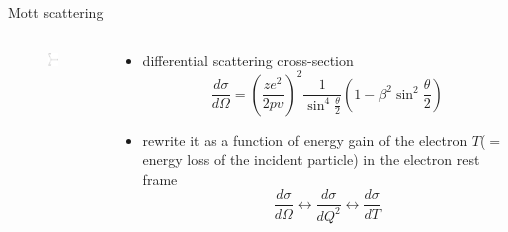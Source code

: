 \documentclass{beamer}
\begin{document}
\begin{frame}{Mott scattering}
\begin{columns}
	\begin{column}{0.2\textwidth}
		\begin{figure}
			\includegraphics[width=\textwidth]{plots/Mott_Feyn.pdf}
		\end{figure}
	\end{column}
	\begin{column}{0.8\textwidth}
	\begin{itemize}
	\item	differential scattering cross-section
		\begin{equation}
		\frac{d\sigma}{d\Omega}=\left( \frac{ze^2}{2pv} \right)^2 \frac{1}{\sin^4\frac{\theta}{2}} \left( 1-\beta^2\sin^2\frac{\theta}{2} \right)
		\end{equation}
	\item rewrite it as a function of energy gain of the electron $T$($=$ energy loss of the incident particle) in the electron rest frame
		\begin{equation*}
		\frac{d\sigma}{d\Omega}\leftrightarrow \frac{d\sigma}{dQ^2}\leftrightarrow \frac{d\sigma}{dT}
		\end{equation*}
		

\end{itemize}
\end{column}
\end{columns}
\end{frame}
\end{document}
